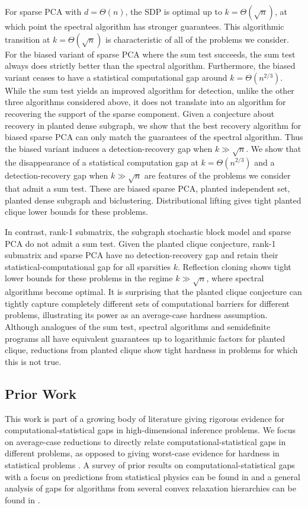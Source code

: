 For sparse PCA with $d = \Theta(n)$, the SDP is optimal up to $k = \Theta(\sqrt{n})$, at which point the spectral algorithm has stronger guarantees. This algorithmic transition at $k = \Theta(\sqrt{n})$ is characteristic of all of the problems we consider. For the biased variant of sparse PCA where the sum test succeeds, the sum test always does strictly better than the spectral algorithm. Furthermore, the biased variant ceases to have a statistical computational gap around $k = \Theta(n^{2/3})$. While the sum test yields an improved algorithm for detection, unlike the other three algorithms considered above, it does not translate into an algorithm for recovering the support of the sparse component. Given a conjecture about recovery in planted dense subgraph, we show that the best recovery algorithm for biased sparse PCA can only match the guarantees of the spectral algorithm. Thus the biased variant induces a detection-recovery gap when $k \gg \sqrt{n}$. We show that the disappearance of a statistical computation gap at $k = \Theta(n^{2/3})$ and a detection-recovery gap when $k \gg \sqrt{n}$ are features of the problems we consider that admit a sum test. These are biased sparse PCA, planted independent set, planted dense subgraph and biclustering. Distributional lifting gives tight planted clique lower bounds for these problems.

In contrast, rank-1 submatrix, the subgraph stochastic block model and sparse PCA do not admit a sum test. Given the planted clique conjecture, rank-1 submatrix and sparse PCA have no detection-recovery gap and retain their statistical-computational gap for all sparsities $k$. Reflection cloning shows tight lower bounds for these problems in the regime $k \gg \sqrt{n}$, where spectral algorithms become optimal. It is surprising that the planted clique conjecture can tightly capture completely different sets of computational barriers for different problems, illustrating its power as an average-case hardness assumption. Although analogues of the sum test, spectral algorithms and semidefinite programs all have equivalent guarantees up to logarithmic factors for planted clique, reductions from planted clique show tight hardness in problems for which this is not true.

\subsection{Prior Work}

This work is part of a growing body of literature giving rigorous evidence for computational-statistical gaps in high-dimensional inference problems. We focus on average-case reductions to directly relate computational-statistical gaps in different problems, as opposed to giving worst-case evidence for hardness in statistical problems \cite{zhang2014lower, hardt2014computational, chan2016approximability}. A survey of prior results on computational-statistical gaps with a focus on predictions from statistical physics can be found in \cite{bandeira2018notes} and a general analysis of gaps for algorithms from several convex relaxation hierarchies can be found in \cite{chandrasekaran2013computational}.

